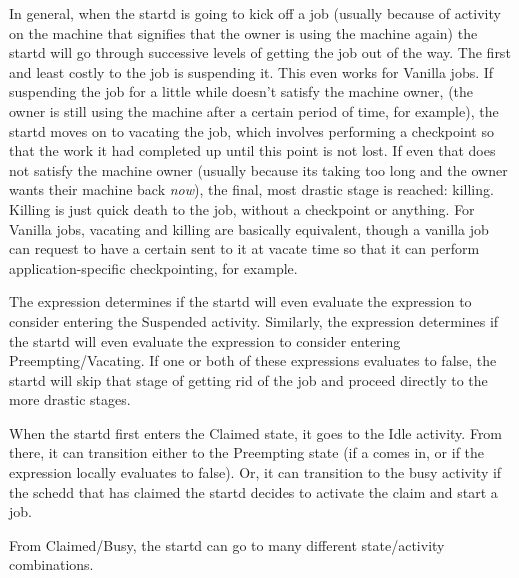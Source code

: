 In general, when the startd is going to kick off a job (usually
because of activity on the machine that signifies that the owner is
using the machine again) the startd will go through successive levels
of getting the job out of the way.  The first and least costly to the
job is suspending it.  This even works for Vanilla jobs.  If
suspending the job for a little while doesn't satisfy the machine
owner, (the owner is still using the machine after a certain period of
time, for example), the startd moves on to vacating the job, which
involves performing a checkpoint so that the work it had completed up
until this point is not lost.  If even that does not satisfy the
machine owner (usually because its taking too long and the owner wants
their machine back \emph{now}), the final, most drastic stage is
reached: killing.  Killing is just quick death to the job, without a
checkpoint or anything.  For Vanilla jobs, vacating and killing are
basically equivalent, though a vanilla job can request to have a
certain  sent to it at vacate time so that it
can perform application-specific checkpointing, for example.

The  expression determines if the startd will even
evaluate the  expression to consider entering the
Suspended activity.  Similarly, the  expression
determines if the startd will even evaluate the 
expression to consider entering Preempting/Vacating.  If one or both
of these expressions evaluates to false, the startd will skip that
stage of getting rid of the job and proceed directly to the more
drastic stages.

When the startd first enters the Claimed state, it goes to the Idle
activity.  From there, it can transition either to the Preempting
state (if a  comes in, or if the 
expression locally evaluates to false).  Or, it can transition to the
busy activity if the schedd that has claimed the startd decides to
activate the claim and start a job.

From Claimed/Busy, the startd can go to many different state/activity
combinations.


